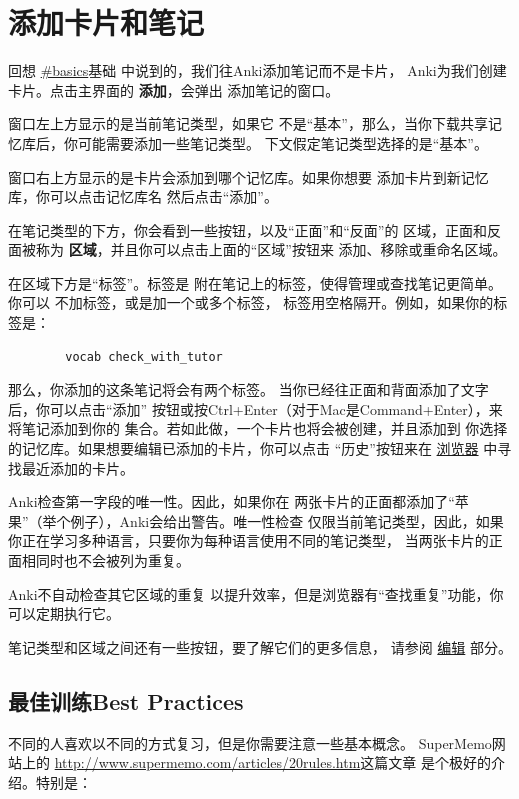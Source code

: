 \documentclass[a4paper]{book}
\begin{document}
	\section{添加卡片和笔记}
	
	回想 \url{#basics}基础 中说到的，我们往Anki添加笔记而不是卡片， Anki为我们创建卡片。点击主界面的 \textbf{添加}，会弹出 添加笔记的窗口。
	
	窗口左上方显示的是当前笔记类型，如果它 不是“基本”，那么，当你下载共享记忆库后，你可能需要添加一些笔记类型。 下文假定笔记类型选择的是“基本”。
	
	窗口右上方显示的是卡片会添加到哪个记忆库。如果你想要 添加卡片到新记忆库，你可以点击记忆库名 然后点击“添加”。
	
	在笔记类型的下方，你会看到一些按钮，以及“正面”和“反面”的 区域，正面和反面被称为 \textbf{区域}，并且你可以点击上面的“区域”按钮来 添加、移除或重命名区域。
	
	在区域下方是“标签”。标签是 附在笔记上的标签，使得管理或查找笔记更简单。你可以 不加标签，或是加一个或多个标签， 标签用空格隔开。例如，如果你的标签是：
	
	\begin{shaded}\begin{verbatim}
		vocab check_with_tutor
		\end{verbatim}\end{shaded}
	
	那么，你添加的这条笔记将会有两个标签。
	当你已经往正面和背面添加了文字后，你可以点击“添加” 按钮或按Ctrl+Enter（对于Mac是Command+Enter），来将笔记添加到你的 集合。若如此做，一个卡片也将会被创建，并且添加到 你选择的记忆库。如果想要编辑已添加的卡片，你可以点击 “历史”按钮来在 \hyperref[browser]{浏览器} 中寻找最近添加的卡片。
	
	Anki检查第一字段的唯一性。因此，如果你在 两张卡片的正面都添加了“苹果”（举个例子），Anki会给出警告。唯一性检查 仅限当前笔记类型，因此，如果你正在学习多种语言，只要你为每种语言使用不同的笔记类型， 当两张卡片的正面相同时也不会被列为重复。
	
	Anki不自动检查其它区域的重复 以提升效率，但是浏览器有“查找重复”功能，你可以定期执行它。
	
	笔记类型和区域之间还有一些按钮，要了解它们的更多信息， 请参阅
	\hyperref[editor]{编辑} 部分。
	
	\subsection{最佳训练Best Practices}
	
	不同的人喜欢以不同的方式复习，但是你需要注意一些基本概念。 SuperMemo网站上的 \url{http://www.supermemo.com/articles/20rules.htm}这篇文章 是个极好的介绍。特别是：
	
\end{document}
